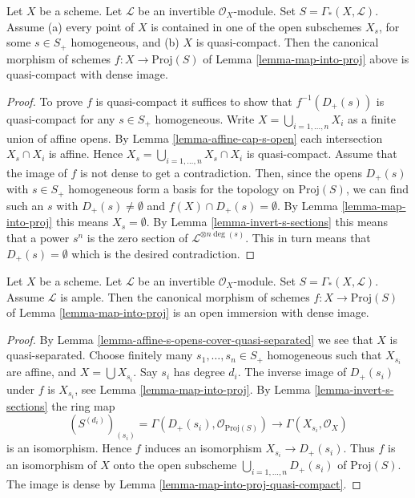 \begin{lemma}
\label{lemma-map-into-proj-quasi-compact}
Let $X$ be a scheme. Let $\mathcal{L}$ be an invertible $\mathcal{O}_X$-module.
Set $S = \Gamma_*(X, \mathcal{L})$.
Assume (a) every point of $X$ is contained in one of the
open subschemes $X_s$, for some $s \in S_{+}$ homogeneous,
and (b) $X$ is quasi-compact. Then the canonical morphism of schemes
$f : X \longrightarrow \text{Proj}(S)$ of Lemma \ref{lemma-map-into-proj}
above is quasi-compact with dense image.
\end{lemma}

\begin{proof}
To prove $f$ is quasi-compact it suffices to show that $f^{-1}(D_{+}(s))$
is quasi-compact for any $s \in S_{+}$ homogeneous. Write
$X = \bigcup_{i = 1, \ldots, n} X_i$ as a finite union of
affine opens. By Lemma \ref{lemma-affine-cap-s-open} each intersection
$X_s \cap X_i$ is affine. Hence $X_s = \bigcup_{i = 1, \ldots, n} X_s \cap X_i$
is quasi-compact. Assume that the image of $f$ is not dense to get
a contradiction. Then, since the opens $D_+(s)$ with $s \in S_+$ homogeneous
form a basis for the topology on $\text{Proj}(S)$, we can find such
an $s$ with $D_+(s) \not = \emptyset$ and $f(X) \cap D_+(s) = \emptyset$.
By Lemma \ref{lemma-map-into-proj}
this means $X_s = \emptyset$. By Lemma \ref{lemma-invert-s-sections}
this means that a power $s^n$ is the zero section of
$\mathcal{L}^{\otimes n\deg(s)}$.
This in turn means that $D_+(s) = \emptyset$ which is the
desired contradiction.
\end{proof}

\begin{lemma}
\label{lemma-ample-immersion-into-proj}
Let $X$ be a scheme. Let $\mathcal{L}$ be an invertible $\mathcal{O}_X$-module.
Set $S = \Gamma_*(X, \mathcal{L})$.
Assume $\mathcal{L}$ is ample. Then the canonical morphism of schemes
$f : X \longrightarrow \text{Proj}(S)$ of Lemma \ref{lemma-map-into-proj}
is an open immersion with dense image.
\end{lemma}

\begin{proof}
By Lemma \ref{lemma-affine-s-opens-cover-quasi-separated} we see
that $X$ is quasi-separated. Choose finitely many
$s_1, \ldots, s_n \in S_{+}$ homogeneous
such that $X_{s_i}$ are affine, and $X = \bigcup X_{s_i}$.
Say $s_i$ has degree $d_i$. The inverse image of
$D_{+}(s_i)$ under $f$ is $X_{s_i}$, see Lemma \ref{lemma-map-into-proj}.
By Lemma \ref{lemma-invert-s-sections} the ring map
$$
(S^{(d_i)})_{(s_i)} = \Gamma(D_{+}(s_i), \mathcal{O}_{\text{Proj}(S)})
\longrightarrow
\Gamma(X_{s_i}, \mathcal{O}_X)
$$
is an isomorphism. Hence $f$ induces an isomorphism
$X_{s_i} \to D_{+}(s_i)$. Thus $f$ is an isomorphism of $X$ onto the open
subscheme $\bigcup_{i = 1, \ldots, n} D_{+}(s_i)$ of $\text{Proj}(S)$.
The image is dense by Lemma \ref{lemma-map-into-proj-quasi-compact}.
\end{proof}

